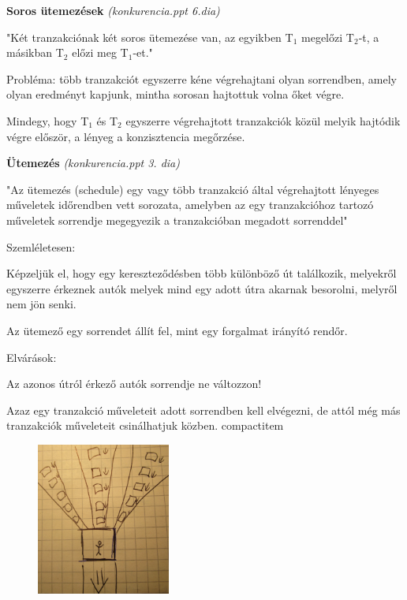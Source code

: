 \documentclass[a4paper,11.5pt, table]{article}
\begin{document}
	{\large \textbf{Soros ütemezések}} \textit{(konkurencia.ppt 6.dia)}
	\begin{compactitem}
		\item "Két tranzakciónak két soros ütemezése van, az egyikben T$_{1}$ megelőzi T$_{2}$‑t, a másikban T$_{2}$ előzi meg T$_{1}$-et."
		
		\item Probléma: több tranzakciót egyszerre kéne végrehajtani olyan sorrendben, amely olyan eredményt kapjunk, mintha sorosan hajtottuk volna őket végre.
		
		\item Mindegy, hogy T$_{1}$ és T$_{2}$ egyszerre végrehajtott tranzakciók közül melyik hajtódik végre először, a lényeg a konzisztencia megőrzése.		
	\end{compactitem}

	{\large \textbf{Ütemezés} }\textit{(konkurencia.ppt 3. dia)}
	\begin{compactitem}
		\item "Az ütemezés (schedule) egy vagy több tranzakció által végrehajtott lényeges műveletek időrendben vett sorozata, amelyben az egy tranzakcióhoz tartozó műveletek sorrendje megegyezik a tranzakcióban megadott sorrenddel"
		
		\item Szemléletesen:
		\begin{compactitem}
			\item Képzeljük el, hogy egy kereszteződésben több különböző út találkozik, melyekről egyszerre érkeznek autók melyek mind egy adott útra akarnak besorolni, melyről nem jön senki.
			\item Az ütemező egy sorrendet állít fel, mint egy forgalmat irányító rendőr.
			\item Elvárások:
			\begin{compactitem}
				\item Az azonos útról érkező autók sorrendje ne változzon!
				\item Azaz egy tranzakció műveleteit adott sorrendben kell elvégezni, de attól még más tranzakciók műveleteit csinálhatjuk közben.
			{compactitem}
			\begin{figure}[h]
				\centering
				\includegraphics[height = 5cm]{abra.jpg}
			\end{figure}
			\end{compactitem}
		\end{compactitem}
	\end{compactitem}
	
\end{document}

